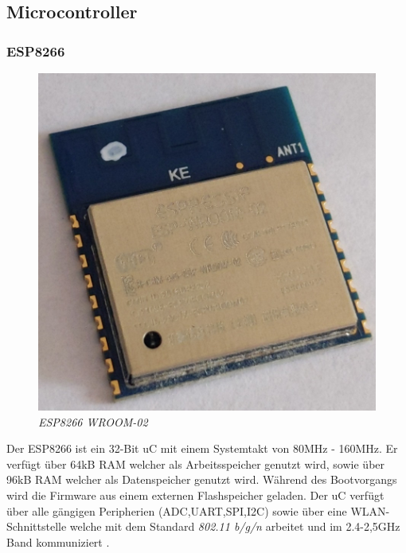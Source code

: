 \subsection{Microcontroller}

\subsubsection{ESP8266}

\begin{figure}
    \vspace{-\baselineskip}
	\centering
	\includegraphics[scale=0.6]{Pictures/esp.jpg}
	\caption{\textit{ESP8266 WROOM-02}}
	\label{img:ESP8266 WROOM-02}
\end{figure}

Der ESP8266 ist ein 32-Bit \ac{uC} mit einem Systemtakt von 80MHz - 160MHz. Er verfügt über 64kB \ac{RAM} welcher als Arbeitsspeicher genutzt
wird, sowie über 96kB \ac*{RAM} welcher als Datenspeicher genutzt wird. Während des Bootvorgangs wird die Firmware aus einem externen Flashspeicher
geladen. Der \ac{uC} verfügt über alle gängigen Peripherien (\acs{ADC},\acs{UART},\acs{SPI},\acs{I2C}) sowie über eine \acs{WLAN}-Schnittstelle
welche mit dem Standard \textit{802.11 b/g/n} arbeitet und im 2.4-2,5GHz Band kommuniziert \citep{ESP8266_Datasheet}.

